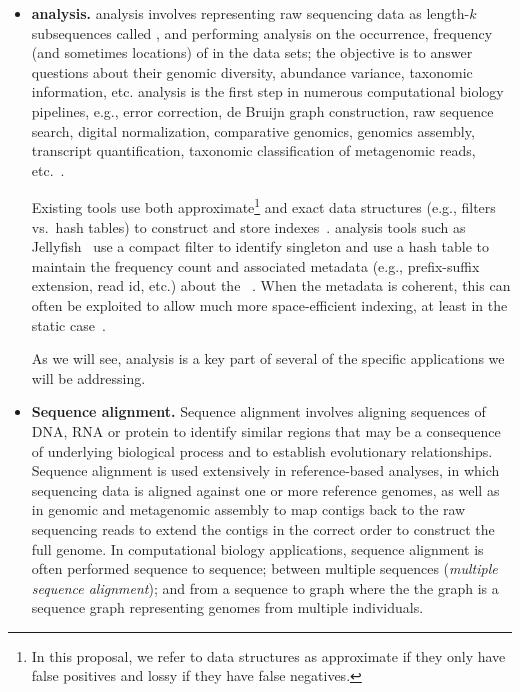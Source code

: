 \begin{itemize}[leftmargin=*]

\item \textbf{\Kmer analysis.}
\Kmer analysis involves representing raw sequencing data as length-$k$ subsequences called \kmers, and performing analysis on the occurrence, frequency (and sometimes locations) of \kmers in the data sets; the objective is to answer questions about their genomic diversity, abundance variance, taxonomic information, etc. \Kmer analysis is the first step in numerous computational biology pipelines, e.g., error correction, de Bruijn graph construction, raw sequence search, digital normalization, comparative genomics, genomics assembly, transcript quantification, taxonomic classification of metagenomic reads, etc.~\cite{wood2014kraken,GeorganasEHG18,hofmeyr2020terabase,solomon2016fast,PatroSailfish:2014,PandeyABFJP18Cell,PandeyBJP17a,PandeyBJP17b}.

Existing tools use both  approximate\footnote{In this proposal, we refer to data structures as approximate if they only have false positives and lossy if they have false negatives.} and exact data structures (e.g., filters vs.\ hash tables) to construct and store \kmer indexes~\cite{MarccaisKi11,PandeyBJP17a}.  \Kmer analysis tools such as  Jellyfish~\cite{MarccaisKi11} use a compact filter to identify singleton \kmers and use a hash table to maintain the frequency count and associated metadata (e.g., prefix-suffix extension, read id, etc.) about the \kmers~\cite{hofmeyr2020terabase}. When the metadata is coherent, this can often be exploited to allow much more space-efficient indexing, at least in the static case~\cite{pibiri2022sparse,pibiri2023weighted,fan2023spt,fan2023fulgor}.

As we will see, \kmer analysis is a key part of several of the specific applications we will be addressing.


\item \textbf{Sequence alignment.} Sequence alignment involves aligning sequences of DNA, RNA or protein to identify similar regions that may be a consequence of underlying biological process and to establish evolutionary relationships.
Sequence alignment is used extensively in reference-based analyses, in which sequencing data is aligned against one or more reference genomes, as well as in genomic and metagenomic assembly to map contigs back to the raw sequencing reads to extend the contigs in the correct order to construct the full genome. In computational biology applications, sequence alignment is often performed sequence to sequence; between multiple sequences (\emph{multiple sequence alignment}); and from a sequence to graph where the the graph is a sequence graph representing genomes from multiple individuals.


\end{itemize}
